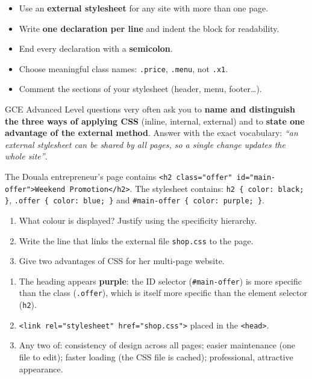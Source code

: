 \documentclass[11pt]{article}
\begin{document}
\begin{aretenir}
\begin{itemize}
\item Use an \textbf{external stylesheet} for any site with more than one page.
\item Write \textbf{one declaration per line} and indent the block for readability.
\item End every declaration with a \textbf{semicolon}.
\item Choose meaningful class names: \texttt{.price}, \texttt{.menu}, not \texttt{.x1}.
\item Comment the sections of your stylesheet (header, menu, footer\ldots).
\end{itemize}
\end{aretenir}

\begin{attention}
GCE Advanced Level questions very often ask you to \textbf{name and distinguish the three ways of applying CSS} (inline, internal, external) and to \textbf{state one advantage of the external method}. Answer with the exact vocabulary: \emph{``an external stylesheet can be shared by all pages, so a single change updates the whole site''}.
\end{attention}

\begin{exercice}
The Douala entrepreneur's page contains \texttt{<h2 class="offer" id="main-offer">Weekend Promotion</h2>}. The stylesheet contains: \texttt{h2 \{ color: black; \}}, \texttt{.offer \{ color: blue; \}} and \texttt{\#main-offer \{ color: purple; \}}.
\begin{enumerate}
\item What colour is displayed? Justify using the specificity hierarchy.
\item Write the line that links the external file \texttt{shop.css} to the page.
\item Give two advantages of CSS for her multi-page website.
\end{enumerate}
\end{exercice}

\begin{corrige}[Exercise 1]
\begin{enumerate}
\item The heading appears \textbf{purple}: the ID selector (\texttt{\#main-offer}) is more specific than the class (\texttt{.offer}), which is itself more specific than the element selector (\texttt{h2}).
\item \texttt{<link rel="stylesheet" href="shop.css">} placed in the \texttt{<head>}.
\item Any two of: consistency of design across all pages; easier maintenance (one file to edit); faster loading (the CSS file is cached); professional, attractive appearance.
\end{enumerate}
\end{corrige}
\end{document}
